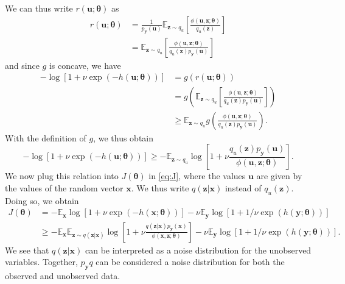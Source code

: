 \documentclass[11pt, oneside]{article}
\newcommand{\thetab}{{\boldsymbol{\theta}}}
\newcommand{\pnn}{\phi}
\newcommand{\pnoise}{p_{ \mathbf y}}
\renewcommand{\u}{{\mathbf u}}
\newcommand{\x}{{\mathbf x}}
\newcommand{\y}{{\mathbf y}}
\newcommand{\z}{{\mathbf z}}
\newcommand{\E}{\mathbb{E}}
\newcommand{\Ex}{\E_{\x}}
\newcommand{\Ey}{\E_{\y}}
\begin{document}
We can thus write $r(\u; \thetab)$ as
\begin{align}
  r(\u;\thetab) &= \frac{1}{\pnoise(\u)}  \E_{\z \sim q_u} \left[\frac{\pnn(\u,\z; \thetab)}{q_u(\z)}\right] \\
  & =  \E_{\z \sim q_u} \left[\frac{\pnn(\u,\z; \thetab)} {q_u(\z)\pnoise(\u)} \right]
  \label{eq:r-importance-sampling}
\end{align}
and since $g$ is concave, we have
\begin{align}
  - \log [1+\nu \exp(-h(\u;\thetab))]  &= g(r(\u; \thetab)) \\
  & = g\left(\E_{\z \sim q_u} \left[\frac{\pnn(\u,\z; \thetab)} {q_u(\z)\pnoise(\u)} \right]\right)\\
  & \ge \E_{\z \sim q_u} g\left( \frac{\pnn(\u,\z; \thetab)} {q_u(\z)\pnoise(\u)} \right).
\end{align}
With the definition of $g$, we thus obtain
\begin{equation}
  - \log [1+\nu \exp(-h(\u;\thetab))]  \ge -\E_{\z \sim q_u} \log \left[1+\nu \frac{q_u(\z)\pnoise(\u)}{\pnn(\u,\z; \thetab)}\right].
\end{equation}
We now plug this relation into $J(\thetab)$ in \eqref{eq:J}, where the values $\u$ are given by the values of the random vector $\x$. We thus write $q(\z|\x)$ instead of $q_u(\z)$. Doing so, we obtain 
\begin{align}
  J(\thetab)  &= - \Ex  \log \left[1+\nu \exp(-h(\x;\thetab))\right] - \nu \Ey \log \left[1+1/\nu \exp(h(\y;\thetab))\right]\\
  & \ge  -\Ex \E_{\z \sim q(\z|\x)} \log \left[1+\nu \frac{q(\z|\x)\pnoise(\x)}{\pnn(\x,\z; \thetab)}\right] -  \nu \Ey \log \left[1+1/\nu \exp(h(\y;\thetab))\right].
  \label{eq:Jbound1}
\end{align}
We see that $q(\z|\x)$ can be interpreted as a noise distribution for the unobserved variables. Together, $\pnoise q$ can be considered a noise distribution for both the observed and unobserved data.
\end{document}
